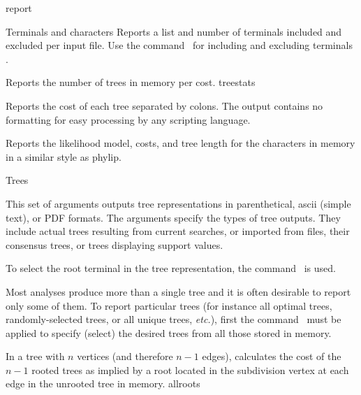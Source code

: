 \begin{command}{report}{}
\begin{arguments}
\begin{argumentgroup}{Terminals and characters}
                {Reports a list and number of terminals included and excluded
                per input file. Use the command~ for including and excluding
                terminals .}
                {}

                {Reports the number of trees in memory per cost.}
                {treestats}

                {Reports the cost of each tree separated by colons. The output
                contains no formatting for easy processing by any scripting
                language.}
                {}

                {Reports the likelihood model, costs, and tree length for the
                characters in memory in a similar style as phylip.}
                {}

		\end{argumentgroup}

		\begin{argumentgroup}{Trees}
            {This set of arguments outputs tree representations
            in parenthetical, ascii (simple text), or PDF formats.
            The arguments specify the types of tree outputs. They include
            actual trees resulting from current searches, or imported from
            files, their consensus trees, or trees displaying support values.
            
            To select the root terminal in the tree representation, the command~ is used.
            
            Most analyses produce more than a single tree and it is
            often desirable to report only some of them. To
            report particular trees (for instance all optimal trees,
            randomly-selected trees, or all unique trees, \emph{etc.}), first the
            command~ must be applied to specify (select)
             the desired trees from all those stored in memory.} 

                {In a tree with $n$ vertices (and therefore $n - 1$ edges),
                calculates the cost of the $n - 1$ rooted trees as implied by a
                root located in the subdivision vertex at each edge in the unrooted
                tree in memory.}
                {allroots}


\end{argumentgroup}
\end{arguments}
\end{command}
